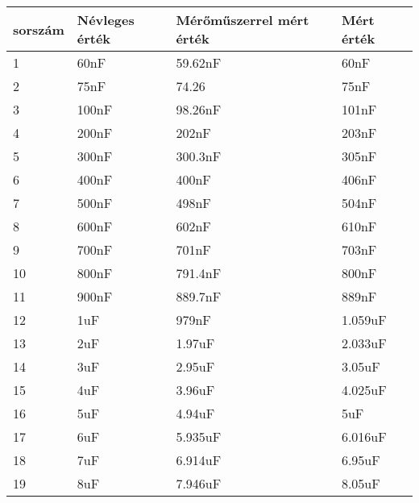 \begin{table}[H]
    \begin{tabular}{|l|l|l|l|}
    \hline
    sorszám & Névleges érték & Mérőműszerrel mért érték & Mért érték \\ \hline
    1       & 60nF           & 59.62nF                  & 60nF       \\ \hline
    2       & 75nF           & 74.26                    & 75nF       \\ \hline
    3       & 100nF          & 98.26nF                  & 101nF      \\ \hline
    4       & 200nF          & 202nF                    & 203nF      \\ \hline
    5       & 300nF          & 300.3nF                  & 305nF      \\ \hline
    6       & 400nF          & 400nF                    & 406nF      \\ \hline
    7       & 500nF          & 498nF                    & 504nF      \\ \hline
    8       & 600nF          & 602nF                    & 610nF      \\ \hline
    9       & 700nF          & 701nF                    & 703nF      \\ \hline
    10      & 800nF          & 791.4nF                  & 800nF      \\ \hline
    11      & 900nF          & 889.7nF                  & 889nF      \\ \hline
    12      & 1uF            & 979nF                    & 1.059uF    \\ \hline
    13      & 2uF            & 1.97uF                   & 2.033uF    \\ \hline
    14      & 3uF            & 2.95uF                   & 3.05uF     \\ \hline
    15      & 4uF            & 3.96uF                   & 4.025uF    \\ \hline
    16      & 5uF            & 4.94uF                   & 5uF        \\ \hline
    17      & 6uF            & 5.935uF                  & 6.016uF    \\ \hline
    18      & 7uF            & 6.914uF                  & 6.95uF     \\ \hline
    19      & 8uF            & 7.946uF                  & 8.05uF     \\ \hline
    \end{tabular}
    \end{table}

